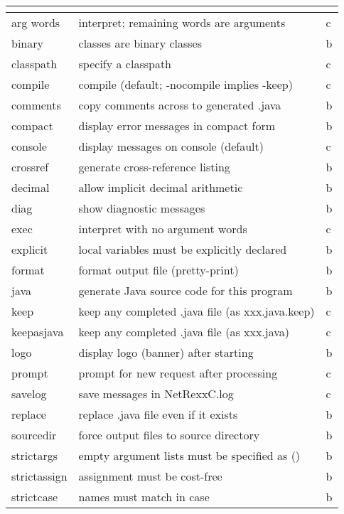 \begin{longtable}[l]{|l|p{10cm}|l|}
\endlastfoot
\rowcolor[gray]{0.8} \bfseries \huge   & \normalsize  &  \\
\hline
arg words & interpret; remaining words are arguments & c \\
\hline
binary &  classes are binary classes & b \\
\hline
 classpath  & specify a classpath & c \\
\hline
 compile  & compile (default; -nocompile implies -keep) & c \\
\hline
 comments     & copy comments across to generated .java &b \\
\hline
 compact      & display error messages in compact form &b \\
\hline
 console   & display messages on console (default) &c \\
\hline
 crossref     & generate cross-reference listing &b \\
\hline
 decimal      & allow implicit decimal arithmetic &b \\
\hline
 diag         & show diagnostic messages &b \\
\hline
 exec        & interpret with no argument words &c \\
\hline
explicit     & local variables must be explicitly declared &b \\
\hline
format       & format output file (pretty-print) &b \\
\hline
java         & generate Java source code for this program &b \\
\hline
 keep         & keep any completed .java file (as xxx.java.keep) &c \\
\hline
keepasjava   & keep any completed .java file (as xxx.java) &c \\
\hline
 logo         & display logo (banner) after starting &b \\
\hline
prompt       & prompt for new request after processing &c \\
\hline
 savelog      & save messages in NetRexxC.log &c \\
\hline
 replace      & replace .java file even if it exists &b \\
\hline
 sourcedir    & force output files to source directory &b \\
\hline
 strictargs   & empty argument lists must be specified as () &b \\
\hline
 strictassign & assignment must be cost-free &b \\
\hline
 strictcase   & names must match in case &b \\

\end{longtable}
